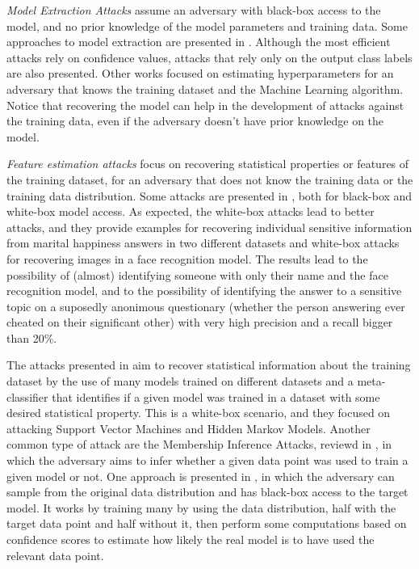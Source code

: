 \emph{Model Extraction Attacks} assume an adversary with black-box access to the model, and no prior knowledge of the model parameters and training data. Some approaches to model extraction are presented in \cite{tramer2016stealing}. Although the most efficient attacks rely on confidence values, attacks that rely only on the output class labels are also presented. Other works focused on estimating hyperparameters \cite{wang2018stealing} for an adversary that knows the training dataset and the Machine Learning algorithm. Notice that recovering the model can help in the development of attacks against the training data, even if the adversary doesn't have prior knowledge on the model.

\emph{Feature estimation attacks} focus on recovering statistical properties or features of the training dataset, for an adversary that does not know the training data or the training data distribution. Some attacks are presented in \cite{fredrikson2015model}, both for black-box and white-box model access. As expected, the white-box attacks lead to better attacks, and they provide examples for recovering individual sensitive information from marital happiness answers in two different datasets and white-box attacks for recovering images in a face recognition model. The results lead to the possibility of (almost) identifying someone with only their name and the face recognition model, and to the possibility of identifying the answer to a sensitive topic on a suposedly anonimous questionary (whether the person answering ever cheated on their significant other) with very high precision and a recall bigger than 20\%. 

The attacks presented in \cite{ateniese2015hacking} aim to recover statistical information about the training dataset by the use of many models trained on different datasets and a meta-classifier that identifies if a given model was trained in a dataset with some desired statistical property. This is a white-box scenario, and they focused on attacking Support Vector Machines and Hidden Markov Models. Another common type of attack are the Membership Inference Attacks, reviewd in \cite{hu2022membership}, in which the adversary aims to infer whether a given data point was used to train a given model or not. One approach is presented in \cite{carlini2022membership}, in which the adversary can sample from the original data distribution and has black-box access to the target model. It works by training many  by using the data distribution, half with the target data point and half without it, then perform some computations based on confidence scores to estimate how likely the real model is to have used the relevant data point.

